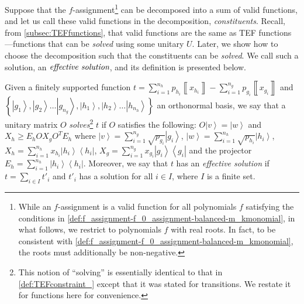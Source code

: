 \documentclass{article}
\newcommand{\atul}[1]{#1} %
\begin{document}
Suppose that the $f$-assignment\footnote{While an $f$-assignment is a valid function for all polynomials
  $f$ satisfying the conditions in \cref{def:f_assignment-f_0_assignment-balanced-m_kmonomial},
  in what follows, we restrict to polynomials $f$
  with real roots. In fact,  to be consistent with \cref{def:f_assignment-f_0_assignment-balanced-m_kmonomial}, the roots
  must additionally be non-negative.} can be decomposed into a sum of valid functions, and let us call these valid functions in
the decomposition, \emph{constituents}.  Recall, from \cref{subsec:TEFfunctions}, that valid functions are the same as TEF functions---functions that can be \emph{solved} using some unitary $U$. Later, we show how to choose the decomposition such that the constituents can be \emph{solved}. We call such a solution, an $\emph{effective solution}$, and its definition is presented below.
%
\begin{definition}
  Given a finitely supported function $t=\sum_{i=1}^{n_{h}}p_{h_{i}}\left\llbracket x_{h_{i}}\right\rrbracket -\sum_{i=1}^{n_{g}}p_{g_{i}}\left\llbracket x_{g_{i}}\right\rrbracket $
  and $\left\{ \left|g_{1}\right\rangle ,\left|g_{2}\right\rangle \dots\left|g_{n_{g}}\right\rangle ,\left|h_{1}\right\rangle ,\left|h_{2}\right\rangle \dots\left|h_{n_{h}}\right\rangle \right\} $ an orthonormal basis,
  we say that a unitary matrix $O$ \emph{solves}\footnote{\atul{This notion of ``solving'' is essentially identical to that in \cref{def:TEFconstraint_} except that it was stated for transitions. We restate it for functions here for convenience.}} $t$ if $O$ satisfies
  the following: $O\left|v\right\rangle =\left|w\right\rangle $ and
  $X_{h}\ge E_{h}OX_{g}O^{T}E_{h}$ where $\left|v\right\rangle =\sum_{i=1}^{n_{g}}\sqrt{p_{g_{i}}}\left|g_{i}\right\rangle $,
  $\left|w\right\rangle =\sum_{i=1}^{n_{h}}\sqrt{p_{h_{i}}}\left|h_{i}\right\rangle $,
  $X_{h}=\sum_{i=1}^{n_{h}}x_{h_{i}}\left|h_{i}\right\rangle \left\langle h_{i}\right|$,
  $X_{g}=\sum_{i=1}^{n_{g}}x_{g_{i}}\left|g_{i}\right\rangle \left\langle g_{i}\right|$
  and the projector $E_{h}=\sum_{i=1}^{n_{h}}\left|h_{i}\right\rangle \left\langle h_{i}\right|$. Moreover, we say that $t$ has an \emph{effective solution} if $t=\sum_{i\in I}t'_i$ and $t'_i$ has a solution for all $i\in I$, where $I$ is a finite set.
  \label{def:solvingassignment}
\end{definition}
\end{document}
